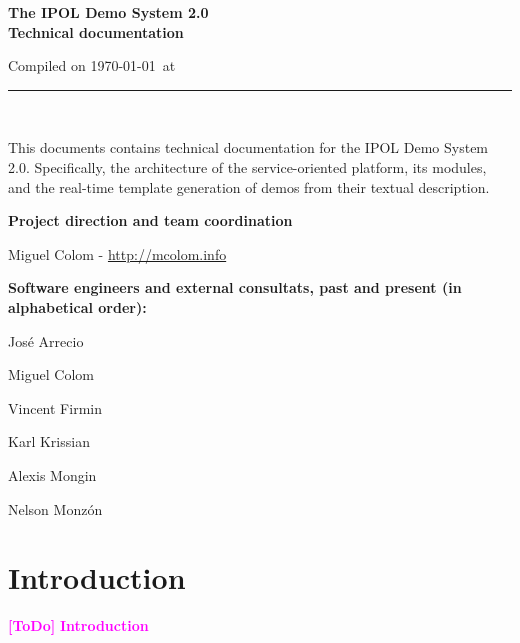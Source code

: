 \documentclass[a4paper,12pt]{article}
\newcommand{\ToDo}[1]{\textcolor{magenta}{\textbf{[ToDo]} \textbf{#1}}}
\begin{document}
\begin{titlepage}

\begin{center}
\vspace*{-1in}

\vspace*{0.6in}
\begin{Large}
\textbf{The IPOL Demo System 2.0 \\Technical documentation} \\
\end{Large}

\vspace*{0.6in}

\small{Compiled on \today\ at \currenttime}

\vspace*{0.6in}
\rule{80mm}{0.1mm}\\
\vspace*{0.1in}
\end{center}

\end{titlepage}

This documents contains technical documentation for the IPOL Demo System 2.0. Specifically, the architecture of the service-oriented platform, its modules, and the real-time template generation of demos from their textual description.
\vspace*{0.6in}

\textbf{Project direction and team coordination}

Miguel Colom - \url{http://mcolom.info}

\vspace*{0.2in}

\textbf{Software engineers and external consultats, past and present (in alphabetical order):}


José Arrecio

Miguel Colom

Vincent Firmin

Karl Krissian

Alexis Mongin

Nelson Monzón


\newpage

\tableofcontents
\newpage
\listoffigures
\newpage

\section{Introduction}
\ToDo{Introduction}
\end{document}
